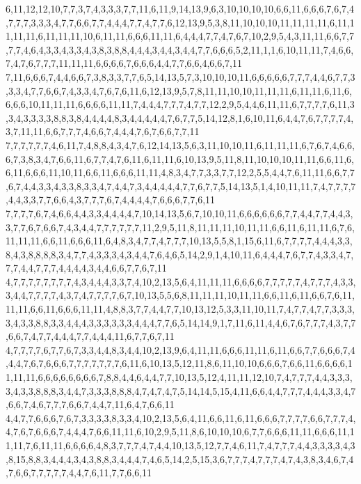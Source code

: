 6,11,12,12,10,7,7,3,7,4,3,3,3,7,7,11,6,11,9,14,13,9,6,3,10,10,10,10,6,6,11,6,6,6,7,6,7,4,7,7,7,3,3,3,4,7,7,6,6,7,7,4,4,4,7,7,4,7,7,6,12,13,9,5,3,8,11,10,10,10,11,11,11,11,6,11,11,11,11,6,11,11,11,10,6,11,11,6,6,6,11,11,6,4,4,4,7,7,4,7,6,7,10,2,9,5,4,3,11,11,6,6,7,7,7,7,4,6,4,3,3,4,3,3,4,3,8,3,8,8,4,4,4,3,4,4,3,4,4,7,7,6,6,6,5,2,11,1,1,6,10,11,11,7,4,6,6,7,4,7,6,7,7,7,11,11,11,6,6,6,6,7,6,6,6,4,4,7,7,6,6,4,6,6,7,11
7,11,6,6,6,7,4,4,6,6,7,3,8,3,3,7,7,6,5,14,13,5,7,3,10,10,10,11,6,6,6,6,6,7,7,7,4,4,6,7,7,3,3,3,4,7,7,6,6,7,4,3,3,4,7,6,7,6,11,6,12,13,9,5,7,8,11,11,10,10,11,11,11,6,11,11,6,11,6,6,6,6,10,11,11,11,6,6,6,6,11,11,7,4,4,4,7,7,7,4,7,7,12,2,9,5,4,4,6,11,11,6,7,7,7,7,6,11,3,3,4,3,3,3,3,8,8,3,8,4,4,4,4,8,3,4,4,4,4,4,7,6,7,7,5,14,12,8,1,6,10,11,6,4,4,7,6,7,7,7,7,4,3,7,11,11,6,6,7,7,7,4,6,6,7,4,4,4,7,6,7,6,6,7,7,11
7,7,7,7,7,7,4,6,11,7,4,8,8,4,3,4,7,6,12,14,13,5,6,3,11,10,10,11,6,11,11,11,6,7,6,7,4,6,6,6,7,3,8,3,4,7,6,6,11,6,7,7,4,7,6,11,6,11,11,6,10,13,9,5,11,8,11,10,10,10,11,11,6,6,11,6,6,11,6,6,6,11,10,11,6,6,11,6,6,6,11,11,4,8,3,4,7,7,3,3,7,7,12,2,5,5,4,4,7,6,11,11,6,6,7,7,6,7,4,4,3,3,4,3,3,8,3,3,4,7,4,4,7,3,4,4,4,4,4,7,7,6,7,7,5,14,13,5,1,4,10,11,11,7,4,7,7,7,7,4,4,3,3,7,7,6,6,4,3,7,7,7,6,7,4,4,4,4,7,6,6,6,7,7,6,11
7,7,7,7,6,7,4,6,6,4,4,3,3,4,4,4,4,7,10,14,13,5,6,7,10,10,11,6,6,6,6,6,6,7,7,4,4,7,7,4,4,3,3,7,7,6,7,6,6,7,4,3,4,4,7,7,7,7,7,7,11,2,9,5,11,8,11,11,11,10,11,11,6,6,11,6,11,11,6,7,6,11,11,11,6,6,11,6,6,6,11,6,4,8,3,4,7,7,4,7,7,7,10,13,5,5,8,1,15,6,11,6,7,7,7,7,4,4,4,3,3,8,4,3,8,8,8,8,3,4,7,7,4,3,3,3,4,3,4,4,7,6,4,6,5,14,2,9,1,4,10,11,6,4,4,4,7,6,7,7,4,3,3,4,7,7,7,4,4,7,7,7,4,4,4,4,3,4,4,6,6,7,7,6,7,11
4,7,7,7,7,7,7,7,7,4,3,4,4,4,3,3,7,4,10,2,13,5,6,4,11,11,11,6,6,6,6,7,7,7,7,7,4,7,7,7,4,3,3,3,4,4,7,7,7,7,4,3,7,4,7,7,7,7,6,7,10,13,5,5,6,8,11,11,11,10,11,11,6,6,11,6,11,6,6,7,6,11,11,11,6,6,11,6,6,6,11,11,4,8,8,3,7,7,4,4,7,7,10,13,12,5,3,3,11,10,11,7,4,7,7,4,7,7,3,3,3,3,4,3,3,8,8,3,3,4,4,4,3,3,3,3,3,3,4,4,4,7,7,6,5,14,14,9,1,7,11,6,11,4,4,6,7,6,7,7,7,4,3,7,7,6,6,7,4,7,7,4,4,4,7,7,4,4,4,11,6,7,7,6,7,11
4,7,7,7,7,6,7,7,6,7,3,3,4,4,8,3,4,4,10,2,13,9,6,4,11,11,6,6,6,11,11,6,11,6,6,7,7,6,6,6,7,4,4,4,7,6,7,6,6,6,7,7,7,7,7,7,7,6,11,6,10,13,5,12,11,8,6,11,10,10,6,6,6,7,6,6,11,6,6,6,6,11,11,11,6,6,6,6,6,6,6,6,7,8,8,4,4,6,4,4,7,7,10,13,5,12,4,11,11,12,10,7,4,7,7,7,4,4,3,3,3,3,4,3,3,8,8,8,3,4,4,7,3,3,3,8,8,8,4,7,4,7,4,7,5,14,14,5,15,4,11,6,6,4,4,7,7,7,4,4,4,3,3,4,7,6,6,7,4,6,7,7,7,6,6,7,4,4,7,11,6,4,7,6,6,11
4,4,7,7,6,6,6,7,6,7,3,3,3,3,8,3,3,4,10,2,13,5,6,4,11,6,6,11,6,11,6,6,6,7,7,7,7,6,6,7,7,7,4,4,7,6,7,6,6,6,7,4,4,4,7,6,6,11,11,6,10,2,9,5,11,8,6,10,10,10,6,7,7,6,6,6,11,11,6,6,6,11,11,11,7,6,11,11,6,6,6,6,4,8,3,7,7,7,4,7,4,4,10,13,5,12,7,7,4,6,11,7,4,7,7,7,4,4,3,3,3,3,4,3,8,15,8,8,3,4,4,4,3,4,3,8,8,3,4,4,4,7,4,6,5,14,2,5,15,3,6,7,7,7,4,7,7,7,4,7,4,3,8,3,4,6,7,4,7,6,6,7,7,7,7,7,4,4,7,6,11,7,7,6,6,11
